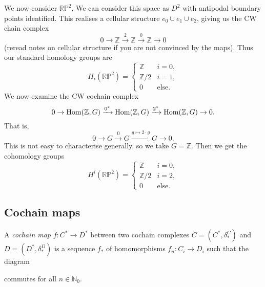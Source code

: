 \begin{example}
    We now consider $\mathbb R \mathbb P^2$. We can consider this space as $D^2$ with antipodal boundary points identified. This realises a cellular structure $e_0 \cup e_1 \cup e_2$, giving us the CW chain complex
    \[
        0 \to \mathbb Z \xrightarrow{2} \mathbb Z \xrightarrow{0} \mathbb Z \to 0
    \]
    (reread notes on cellular structure if you are not convinced by the maps). Thus our standard homology groups are
    \[
        H_i(\mathbb R \mathbb P^2) = \begin{cases}
            \mathbb Z   & i = 0,       \\
            \mathbb Z/2 & i = 1,       \\
            0           & \text{else}.
        \end{cases}
    \]
    We now examine the CW cochain complex
    \[
        0
        \to \operatorname{Hom}(\mathbb Z, G)
        \xrightarrow{0^*} \operatorname{Hom}(\mathbb Z, G)
        \xrightarrow{2^*} \operatorname{Hom}(\mathbb Z, G)
        \to 0.
    \]
    That is,
    \[
        0
        \to G
        \xrightarrow{0} G
        \xrightarrow{g \mapsto 2 \cdot g} G
        \to 0.
    \]
    This is not easy to characterise generally, so we take $G = \mathbb Z$. Then we get the cohomology groups
    \[
        H^i(\mathbb R \mathbb P^2) = \begin{cases}
            \mathbb Z   & i = 0,       \\
            \mathbb Z/2 & i = 2,       \\
            0           & \text{else}.
        \end{cases}
    \]
\end{example}

\subsection{Cochain maps}

\begin{definition}
    A \emph{cochain map} $f: C^* \to D^*$ between two cochain complexes $C = (C^*, \delta^C_*)$ and $D = (D^*, \delta^D_*)$ is a sequence $f_*$ of homomorphisms $f_n: C_i \to D_i$ such that the diagram
    \begin{center}
    \end{center}
    commutes for all $n \in \mathbb N_0$.
\end{definition}

